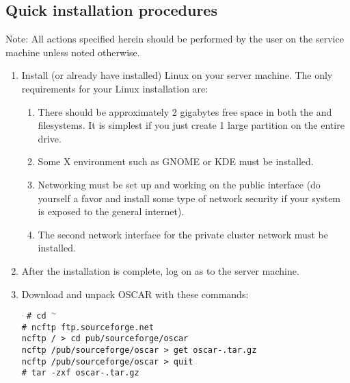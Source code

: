 \subsection{Quick installation procedures}

Note: All actions specified herein should be performed by the
 user on the service machine unless noted otherwise.

\begin {enumerate}
\item Install (or already have installed) Linux on your server
  machine.  The only requirements for your Linux installation are:

  \begin{enumerate}
  \item There should be approximately 2 gigabytes free space in both
    the \file{/} and  filesystems. It is simplest if you
    just create 1 large partition on the entire drive.
    
  \item Some X environment such as GNOME or KDE must be installed.
  \item Networking must be set up and working on the public interface
    (do yourself a favor and install some type of network security if
    your system is exposed to the general internet).
  \item The second network interface for the private cluster network
    must be installed.
  \end{enumerate}
  
  
\item After the installation is complete, log on as  to the server
  machine.

\item Download and unpack OSCAR with these commands:

  \vspace{11pt}
  {\tt
    \# cd $^\sim$ \\
    \# ncftp ftp.sourceforge.net \\
    ncftp / > cd pub/sourceforge/oscar \\
    ncftp /pub/sourceforge/oscar > get oscar-\oscarversion.tar.gz \\
    ncftp /pub/sourceforge/oscar > quit \\
    \# tar -zxf oscar-\oscarversion.tar.gz
    }
  \vspace{11pt}


\end{enumerate}
